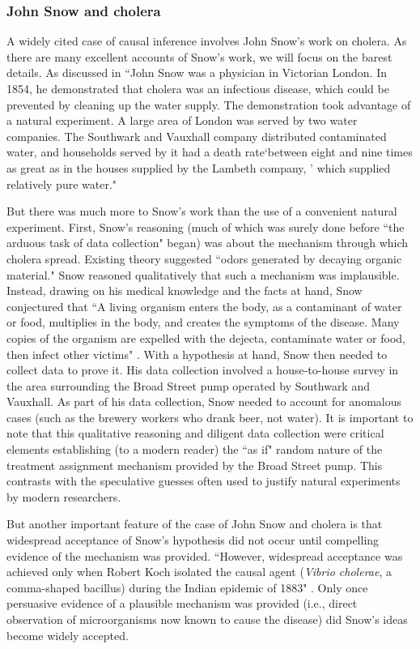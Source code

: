 \documentclass[11pt,reqno,titlepage]{amsart}
\begin{document}
\begin{doublespace}
\subsubsection{John Snow and cholera}
A widely cited case of causal inference involves John Snow's work on cholera.
As there are many excellent accounts of Snow's work, we will focus on the barest details.
As discussed in  \citet[p.\,339]{Freedman:2009ur}
``John Snow was a physician in Victorian London.
 In 1854, he demonstrated that cholera was an infectious disease, which could be prevented by cleaning up the water supply. 
The demonstration took advantage of a natural experiment.
 A large area of London was served by two water companies. 
 The Southwark and Vauxhall company distributed contaminated water, and households served by it had a death rate`between eight and nine times as great as in the houses supplied by the Lambeth company, ' which supplied relatively pure water."

But there was much more to Snow's work than the use of a convenient natural experiment.
First, Snow's reasoning (much of which was surely done before ``the arduous task of data collection" began) was about the  mechanism through which cholera spread. Existing theory suggested ``odors generated by decaying organic material."
Snow reasoned qualitatively that such a mechanism was implausible.
Instead, drawing on his medical knowledge and the facts at hand, Snow conjectured that ``A living organism enters the body, as a contaminant of water or food, multiplies in the body, and creates the symptoms of the disease. Many copies of the organism are expelled with the dejecta, contaminate water or food, then infect other victims" \citep[p.\,342]{Freedman:2009ur}.
With a hypothesis at hand, Snow then needed to collect data to prove it.
His data collection involved a house-to-house survey in the area surrounding the Broad Street pump operated by  Southwark and Vauxhall.
As part of his data collection, Snow needed to account for anomalous cases (such as the brewery workers who drank beer, not water).
It is important to note that this qualitative reasoning and diligent data collection were critical elements establishing (to a modern reader) the ``as if" random nature of the treatment assignment mechanism provided by the Broad Street pump.
This contrasts with the speculative guesses often used to justify natural experiments by modern researchers.

But another important feature of the case of John Snow and cholera is that widespread acceptance of Snow's hypothesis did not occur until compelling evidence of the mechanism was provided.
``However, widespread acceptance was achieved only when Robert Koch isolated the causal agent (\emph{Vibrio cholerae}, a comma-shaped bacillus) during the Indian epidemic of 1883"  \citep[p.\,342]{Freedman:2009ur}.
Only once persuasive evidence of a plausible mechanism was provided (i.e., direct observation of microorganisms now known to cause the disease) did Snow's ideas become widely accepted.


\end{doublespace}
\end{document}

